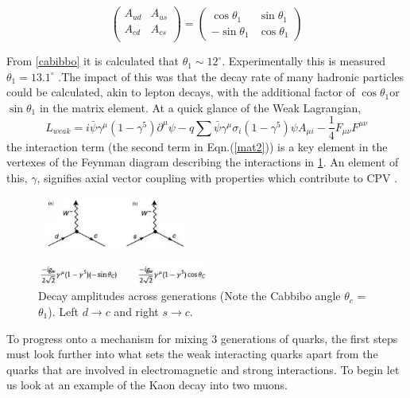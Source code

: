 \begin{equation}\label{mat1}
\left( \begin{array}{ccc} 
A_{ud} & A_{us} \\
A_{cd} & A_{cs}  \\
\end{array} \right)
 = \left( \begin{array}{ccc}
 \cos\theta_{1} & \sin\theta_{1} \\
 -\sin\theta_{1} & \cos\theta_{1} \end{array} \right)\end{equation}

From \cref{cabibbo} it is calculated that $\theta_1\sim 12^{\circ}$. Experimentally this is measured $\theta_1 = 13.1^{\circ}$ \cite{CKM9}.The impact of this was that the decay rate of many hadronic particles could be calculated, akin to lepton decays, with the additional factor of $\cos\theta_1$or $\sin\theta_1$ in the matrix element. At a quick glance of the Weak Lagrangian,
\begin{equation}\label{mat2}
L_{weak} = i\bar{\psi}\gamma^{\mu}(1-\gamma^{5})\partial^{\mu}\psi -q\sum\bar{\psi}\gamma^{\mu}\sigma_{i}(1-\gamma^{5})\psi A_{\mu i} -\frac{1}{4}F_{\mu \nu}F^{\mu \nu}
\end{equation} 
 the interaction term (the second term in Eqn.(\ref{mat2})) is a key element in the vertexes of the Feynman diagram describing the interactions in \cref{fey1}. An element of this, $\gamma$, signifies axial vector coupling with properties which contribute to CPV \cite{CKM2}.

\begin{figure}[h]
\centering
\includegraphics[width=0.5\textwidth]{figs/ckmfig2.jpg}
\caption{Decay amplitudes across generations (Note the Cabbibo angle $\theta_c$ =$\theta_1$). Left $d\rightarrow c$ and right $s\rightarrow c$.}
\label{fey1}
\end{figure}


To progress onto a mechanism for mixing 3 generations of quarks, the first steps must look further into what sets the weak interacting quarks apart from the quarks that are involved in electromagnetic and strong interactions. To begin let us look at an example of the Kaon decay into two muons.

